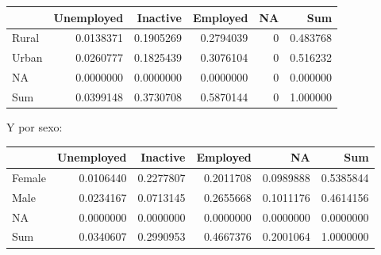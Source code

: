 \documentclass[
  12pt,
]{book}
\newenvironment{Shaded}{\begin{snugshade}}{\end{snugshade}}
\newcommand{\AttributeTok}[1]{\textcolor[rgb]{0.77,0.63,0.00}{#1}}
\newcommand{\FunctionTok}[1]{\textcolor[rgb]{0.00,0.00,0.00}{#1}}
\newcommand{\NormalTok}[1]{#1}
\newcommand{\SpecialCharTok}[1]{\textcolor[rgb]{0.00,0.00,0.00}{#1}}
\newcommand{\StringTok}[1]{\textcolor[rgb]{0.31,0.60,0.02}{#1}}
\begin{document}
\begin{tabular}{l|r|r|r|r|r}
\hline
  & Unemployed & Inactive & Employed & NA & Sum\\
\hline
Rural & 0.0138371 & 0.1905269 & 0.2794039 & 0 & 0.483768\\
\hline
Urban & 0.0260777 & 0.1825439 & 0.3076104 & 0 & 0.516232\\
\hline
NA & 0.0000000 & 0.0000000 & 0.0000000 & 0 & 0.000000\\
\hline
Sum & 0.0399148 & 0.3730708 & 0.5870144 & 0 & 1.000000\\
\hline
\end{tabular}

Y por sexo:

\begin{Shaded}
\end{Shaded}

\begin{tabular}{l|r|r|r|r|r}
\hline
  & Unemployed & Inactive & Employed & NA & Sum\\
\hline
Female & 0.0106440 & 0.2277807 & 0.2011708 & 0.0989888 & 0.5385844\\
\hline
Male & 0.0234167 & 0.0713145 & 0.2655668 & 0.1011176 & 0.4614156\\
\hline
NA & 0.0000000 & 0.0000000 & 0.0000000 & 0.0000000 & 0.0000000\\
\hline
Sum & 0.0340607 & 0.2990953 & 0.4667376 & 0.2001064 & 1.0000000\\
\hline
\end{tabular}

\begin{Shaded}
\end{Shaded}
\end{document}
